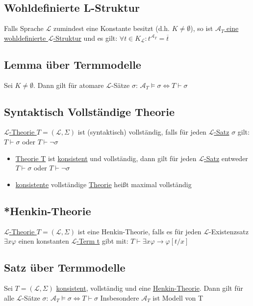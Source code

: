 \documentclass[12pt,a4paper]{article} %
\begin{document}
	\subsection{Wohldefinierte L-Struktur}
	Falls Sprache $\mathcal{L}$ zumindest eine Konstante besitzt (d.h. $K \ne \emptyset$), so ist \hyperref[Struktur]{$\mathcal{A}_T$ eine wohldefinierte $\mathcal{L}$-Struktur} und es gilt: $\forall t \in K_{\mathcal{L}}: t^{\mathcal{A}_T} = \overline{t}$
	
	\subsection{Lemma über Termmodelle}
	Sei  $K \ne \emptyset$. Dann gilt für atomare $\mathcal{L}$-Sätze $\sigma$: $\mathcal{A}_T \hyperref[Erfullbar]{\vDash} \sigma \Leftrightarrow T \hyperref[Beweisbar]{\vdash} \sigma$
	
	\subsection{Syntaktisch Vollständige Theorie}
	\hyperref[Theorie]{$\mathcal{L}$-Theorie $T = (\mathcal{L}, \Sigma)$} ist (syntaktisch) vollständig, falls für jeden \hyperref[LSatz]{$\mathcal{L}$-Satz} $\sigma$ gilt: $T \hyperref[Beweisbar]{\vdash} \sigma$ oder $T \hyperref[Beweisbar]{\vdash} \neg \sigma$
	\begin{itemize}
		\item \hyperref[Theorie]{Theorie T} ist \hyperref[PLKonsistent]{konsistent} und vollständig, dann gilt für jeden \hyperref[LSatz]{$\mathcal{L}$-Satz} entweder $T \hyperref[Beweisbar]{\vdash} \sigma$ oder $T \hyperref[Beweisbar]{\vdash} \neg \sigma$ 
		\item \hyperref[PLKonsistent]{konsistente} vollständige \hyperref[Theorie]{Theorie} heißt maximal vollständig 
	\end{itemize}

	\subsection{*Henkin-Theorie}
	\label{Henkin}
	\hyperref[Theorie]{$\mathcal{L}$-Theorie $T = (\mathcal{L}, \Sigma)$} ist eine Henkin-Theorie, falls es für jeden $\mathcal{L}$-Existenzsatz $\exists x \varphi$ einen konstanten \hyperref[Term]{$\mathcal{L}$-Term t} gibt mit: $T \hyperref[Beweisbar]{\vdash} \exists x \varphi \rightarrow \varphi[t/x]$
	
	\subsection{Satz über Termmodelle}
	Sei $T = (\mathcal{L}, \Sigma)$ \hyperref[PLKonsistent]{konsistent}, vollständig und eine \hyperref[Henkin]{Henkin-Theorie}. Dann gilt für alle $\mathcal{L}$-Sätze $\sigma$: $\mathcal{A}_T \hyperref[Erfullbar]{\vDash} \sigma \Leftrightarrow T \hyperref[Beweisbar]{\vdash} \sigma$ Insbesondere $\mathcal{A}_T$ ist Modell von T
	
\end{document}
